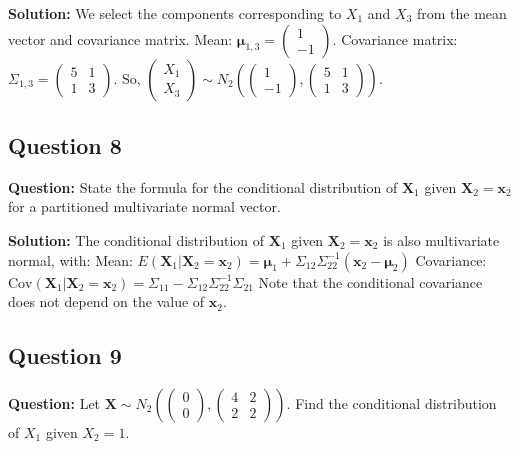 \textbf{Solution:}
We select the components corresponding to $X_1$ and $X_3$ from the mean vector and covariance matrix.
Mean: $\boldsymbol{\mu}_{1,3} = \begin{pmatrix} 1 \\ -1 \end{pmatrix}$.
Covariance matrix: $\Sigma_{1,3} = \begin{pmatrix} 5 & 1 \\ 1 & 3 \end{pmatrix}$.
So, $\begin{pmatrix} X_1 \\ X_3 \end{pmatrix} \sim N_2\left(\begin{pmatrix} 1 \\ -1 \end{pmatrix}, \begin{pmatrix} 5 & 1 \\ 1 & 3 \end{pmatrix}\right)$.

\subsection*{Question 8}
\textbf{Question:} State the formula for the conditional distribution of $\mathbf{X}_1$ given $\mathbf{X}_2 = \mathbf{x}_2$ for a partitioned multivariate normal vector.

\textbf{Solution:}
The conditional distribution of $\mathbf{X}_1$ given $\mathbf{X}_2 = \mathbf{x}_2$ is also multivariate normal, with:
Mean: $E(\mathbf{X}_1 | \mathbf{X}_2=\mathbf{x}_2) = \boldsymbol{\mu}_1 + \Sigma_{12}\Sigma_{22}^{-1}(\mathbf{x}_2 - \boldsymbol{\mu}_2)$
Covariance: $\text{Cov}(\mathbf{X}_1 | \mathbf{X}_2=\mathbf{x}_2) = \Sigma_{11} - \Sigma_{12}\Sigma_{22}^{-1}\Sigma_{21}$
Note that the conditional covariance does not depend on the value of $\mathbf{x}_2$.

\subsection*{Question 9}
\textbf{Question:} Let $\mathbf{X} \sim N_2\left(\begin{pmatrix} 0 \\ 0 \end{pmatrix}, \begin{pmatrix} 4 & 2 \\ 2 & 2 \end{pmatrix}\right)$. Find the conditional distribution of $X_1$ given $X_2 = 1$.

